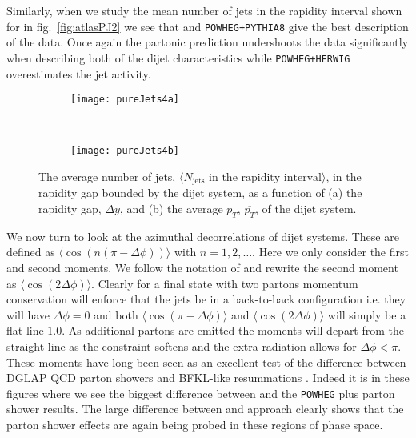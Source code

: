 	Similarly, when we study the mean number of jets in the rapidity interval shown for in
	fig.~\eqref{fig:atlasPJ2} we see that \HEJA and \texttt{POWHEG+PYTHIA8} give the best
	description of the data.  Once again the partonic \HEJ prediction undershoots the data
	significantly when describing both of the dijet characteristics while \texttt{POWHEG+HERWIG}
	overestimates the jet activity.

	\begin{figure}[bth]
		\begin{subfigure}[b]{0.48\textwidth}
			\texttt{[image: pureJets4a]}
			\caption{}
			\label{fig:}
		\end{subfigure}
		~
		\begin{subfigure}[b]{0.48\textwidth}
			\texttt{[image: pureJets4b]}
			\caption{}
			\label{fig:}
		\end{subfigure}
		\caption{The average number of jets, $\langle N_{\text{jets}}
		\text{ in the rapidity interval}\rangle$, in the rapidity gap
		         bounded by the dijet system, as a function of (a) the
		         rapidity gap, $\Delta y$, and (b) the average $p_T$,
		         $\overline{p_T}$, of the dijet system.}
		\label{fig:atlasPJ2}
	\end{figure}

	We now turn to look at the azimuthal decorrelations of dijet systems.  These are defined
	as $\langle\cos(n(\pi-\Delta\phi))\rangle$ with $n=1, 2, \ldots$.  Here we only consider
	the first and second moments.  We follow the notation of \cite{Aad:2014pua}
	and rewrite the second moment as $\langle\cos(2\Delta\phi)\rangle$.  Clearly for a final state
	with two partons momentum conservation will enforce that the jets be in a back-to-back configuration
	i.e. they will have $\Delta \phi=0$ and both $\langle\cos(\pi-\Delta\phi)\rangle$ and
	$\langle\cos(2\Delta\phi)\rangle$ will simply be a flat line $1.0$.  As additional
	partons are emitted the moments will depart from the straight line as the constraint softens
	and the extra radiation allows for $\Delta\phi<\pi$.  These moments have long been seen
	as an excellent test of the difference between DGLAP QCD parton showers and BFKL-like
	resummations \cite{Ducloue:2012bm}.  Indeed it is in these figures where we see the biggest
	difference between \HEJ and the \texttt{POWHEG} plus parton shower results.  The large
	difference between \HEJ and \HEJA approach clearly shows that the parton shower effects
	are again being probed in these regions of phase space.

